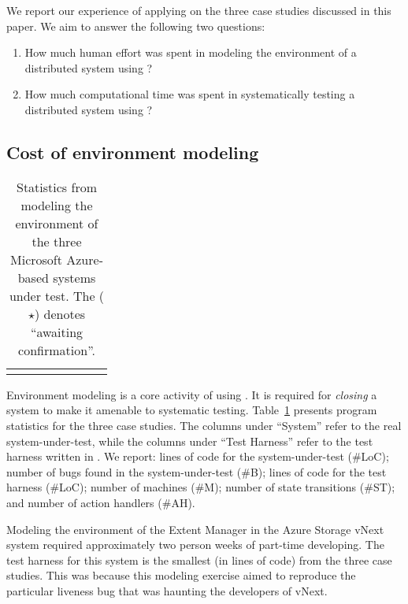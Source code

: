 We report our experience of applying \psharp on the three case studies discussed in this paper. We aim to answer the following two questions:

\begin{enumerate}
\item How much human effort was spent in modeling the environment of a distributed system using \psharp?

\item How much computational time was spent in systematically testing a distributed system using \psharp?
\end{enumerate}

\subsection{Cost of environment modeling}
\label{sec:eval:human_cost}

\newcommand{\colspacing}{\hspace{1.8em}}
\begin{table}[t]
\small
\centering
\setlength{\tabcolsep}{0.3em}
\begin{tabular}{l rrrrr rr}
\centering

\end{tabular}
\caption{Statistics from modeling the environment of the three Microsoft Azure-based systems under test. The ($\star$) denotes ``awaiting confirmation''.}
\label{tab:stats}
\vspace{-4mm}
\end{table}

Environment modeling is a core activity of using \psharp. It is required for \emph{closing} a system to make it amenable to systematic testing. Table~\ref{tab:stats} presents program statistics for the three case studies. The columns under ``System'' refer to the real system-under-test, while the columns under ``\psharp Test Harness'' refer to the test harness written in \psharp. We report: lines of code for the system-under-test (\#LoC); number of bugs found in the system-under-test (\#B); lines of \psharp code for the test harness (\#LoC); number of machines (\#M); number of state transitions (\#ST); and number of action handlers (\#AH).

Modeling the environment of the Extent Manager in the Azure Storage vNext system required approximately two person weeks of part-time developing. The \psharp test harness for this system is the smallest (in lines of code) from the three case studies. This was because this modeling exercise aimed to reproduce the particular liveness bug that was haunting the developers of vNext.

